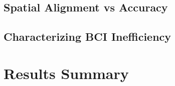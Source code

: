 \subsection{Spatial Alignment vs Accuracy}
\label{subsec:results_alignment_accuracy}

%
%
%
%


\subsection{Characterizing BCI Inefficiency}
\label{subsec:results_bci_inefficiency}

%
%
%
%


\section{Results Summary}
\label{sec:results_summary}

%
%
%
